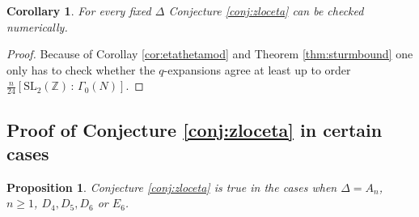 \documentclass[11pt,a4paper]{amsart}
\newtheorem{proposition}[theorem]{Proposition}
\newtheorem{corollary}[theorem]{Corollary}
\theoremstyle{definition}
\newcommand{\SZ}{\mathbb{Z}}                    %
\begin{document}
\begin{corollary}
For every fixed $\Delta$ Conjecture \ref{conj:zloceta} can be checked numerically.
\end{corollary}
\begin{proof}
Because of Corollay \ref{cor:etathetamod} and Theorem \ref{thm:sturmbound}
one only has to check whether the $q$-expansions agree at least up to order $\frac{n}{24} [\mathrm{SL}_2(\SZ) \, : \, \Gamma_0(N) ]$.
\end{proof}


\subsection{Proof of Conjecture \ref{conj:zloceta} in certain cases}
\begin{proposition}
\label{prop:zlocetacheck}
Conjecture \ref{conj:zloceta} is true in the cases when $\Delta=A_n$, $n\geq 1$, $D_4, D_5, D_6$ or $E_6$.
 \end{proposition}
\end{document}
